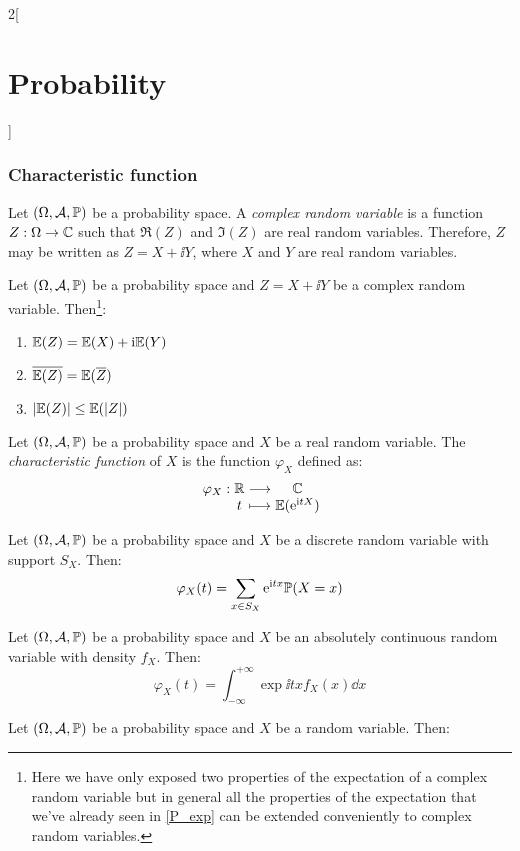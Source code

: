 \documentclass[../../../main.tex]{subfiles}
\begin{document}
\begin{multicols}{2}[\section{Probability}]
  \subsubsection{Characteristic function}
  \begin{definition}
    Let $(\Omega,\mathcal{A},\mathbb{P})$ be a probability space. A \emph{complex random variable} is a function $Z:\Omega\rightarrow\mathbb{C}$ such that $\Re(Z)$ and $\Im(Z)$ are real random variables. Therefore, $Z$ may be written as $Z=X+\ii Y$, where $X$ and $Y$ are real random variables.
  \end{definition}
  \begin{proposition}
    Let $(\Omega,\mathcal{A},\mathbb{P})$ be a probability space and $Z=X+\ii Y$ be a complex random variable. Then\footnote{Here we have only exposed two properties of the expectation of a complex random variable but in general all the properties of the expectation that we've already seen in \cref{P_exp} can be extended conveniently to complex random variables.}:
    \begin{enumerate}
      \item $\mathbb{E}(Z)=\mathbb{E}(X)+\mathrm{i}\mathbb{E}(Y)$
      \item $\overline{\mathbb{E}(Z)}=\mathbb{E}(\overline{Z})$
      \item $|\mathbb{E}(Z)|\leq \mathbb{E}(|Z|)$
    \end{enumerate}
  \end{proposition}
  \begin{definition}
    Let $(\Omega,\mathcal{A},\mathbb{P})$ be a probability space and $X$ be a real random variable. The \emph{characteristic function} of $X$ is the function $\varphi_X$ defined as:
    $$\function{\varphi_X}{\RR}{\CC}{t}{\Exp(\exp{\ii tX})}$$
  \end{definition}
  \begin{proposition}
    Let $(\Omega,\mathcal{A},\mathbb{P})$ be a probability space and $X$ be a discrete random variable with support $S_X$. Then:
    $$\varphi_X(t)=\sum_{x\in S_X}\mathrm{e}^{\mathrm{i} tx}\mathbb{P}(X=x)$$
  \end{proposition}
  \begin{proposition}
    Let $(\Omega,\mathcal{A},\mathbb{P})$ be a probability space and $X$ be an absolutely continuous random variable with density $f_X$. Then:
    $$\varphi_X(t)=\int_{-\infty}^{+\infty}\exp{\ii tx}f_X(x)\dd{x}$$
  \end{proposition}
  \begin{proposition}
    Let $(\Omega,\mathcal{A},\mathbb{P})$ be a probability space and $X$ be a random variable. Then:

\end{proposition}
\end{multicols}
\end{document}
